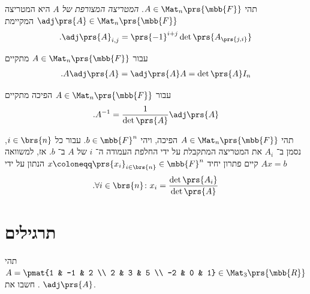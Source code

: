 \documentclass[a4paper,10pt,twoside,openany]{book}
\begin{document}
\begin{definition}
תהי
$A \in \Mat_{n}\prs{\mbb{F}}$.
\emph{המטריצה המצורפת של
$A$}
היא המטריצה
$\adj\prs{A} \in \Mat_n\prs{\mbb{F}}$
המקיימת
\begin{align*}
\text{.} \adj\prs{A}_{i,j} = \prs{-1}^{i+j} \det\prs{A_{\prs{j,i}}}
\end{align*}
\end{definition}

\begin{proposition}
עבור
$A \in\Mat_n\prs{\mbb{F}}$
מתקיים
\begin{align*}
\text{.} A \adj\prs{A} = \adj\prs{A} A = \det\prs{A} I_n
\end{align*}
\end{proposition}

\begin{corollary}
עבור
$A \in \Mat_n\prs{\mbb{F}}$
הפיכה מתקיים
\begin{align*}
\text{.} A^{-1} = \frac{1}{\det\prs{A}} \adj\prs{A}
\end{align*}
\end{corollary}

\begin{theorem}
תהי
$A \in \Mat_n\prs{\mbb{F}}$
הפיכה, ויהי
$b \in \mbb{F}^n$.
עבור כל
$i \in\brs{n}$,
נסמן ב־%
$A_i$
את המטריצה המתקבלת על ידי החלפת העמודה ה־%
$i$
של
$A$
ב־%
$b$.
אז, למשוואה
$Ax = b$
קיים פתרון יחיד
$x \coloneqq \prs{x_i}_{i \in \brs{n}} \in \mbb{F}^n$
הנתון על ידי
\begin{align*}
\text{.} \forall i \in \brs{n} \colon x_i = \frac{\det\prs{A_i}}{\det\prs{A}}
\end{align*}
\end{theorem}

\section{תרגילים}

\begin{exercisechap}
תהי
$A = \pmat{1 & -1 & 2 \\ 2 & 3 & 5 \\ -2 & 0 & 1} \in \Mat_3\prs{\mbb{R}}$.
חשבו את
$\adj\prs{A}$.
\end{exercisechap}
\end{document}
